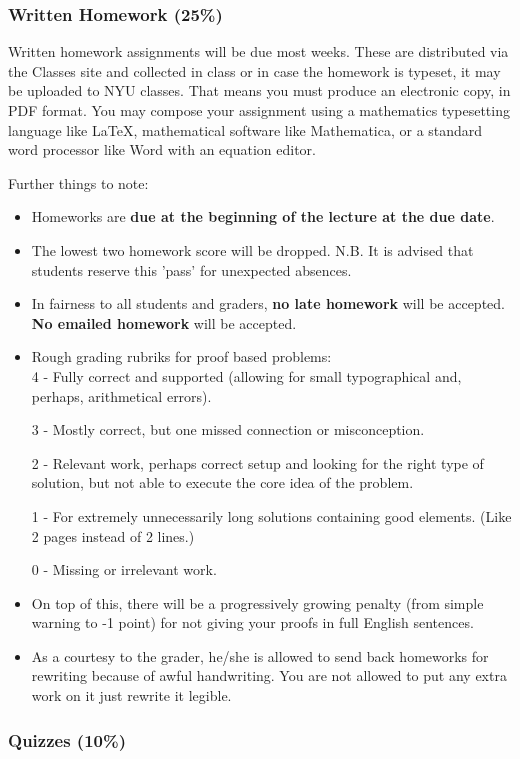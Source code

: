 \documentclass[10pt]{article}
\theoremstyle{definition}
\begin{document}
\subsubsection*{Written Homework (25\%)}
Written homework assignments will be due most weeks. These are distributed via the Classes site and collected in class or in case the homework is typeset, it may be uploaded to NYU classes. That means you must produce an electronic copy, in PDF
format. You may compose your assignment using a mathematics typesetting language like LaTeX, mathematical
software like Mathematica, or a standard word processor like Word with an equation editor.

Further things to note:
\begin{itemize}
\item Homeworks are \textbf{due at the beginning of the lecture at the due date}.
\item The lowest two homework score will be dropped. N.B. It is advised that students reserve this 'pass' for unexpected
absences.
\item In fairness to all students and graders, \textbf{no late homework} will be accepted. \textbf{No emailed homework} will be accepted.
\item Rough grading rubriks for proof based problems:\\
4 - Fully correct and supported (allowing for small typographical and, perhaps, arithmetical errors). 

3 - Mostly correct, but one missed connection or misconception. 

2 - Relevant work, perhaps correct setup and looking for the right type of solution, but not able to execute the core idea of the problem. 

1 - For extremely unnecessarily long solutions containing good elements. (Like 2 pages instead of 2 lines.)

0 - Missing or irrelevant work. 

\item On top of this, there will be a progressively growing penalty (from simple warning to -1 point) for not giving your proofs in full English sentences.

\item As a courtesy to the grader, he/she is allowed to send back homeworks for rewriting because of awful handwriting.  You are not allowed to put any extra work on it just rewrite it legible.
\end{itemize}

\subsubsection*{Quizzes (10\%) }
\end{document}
